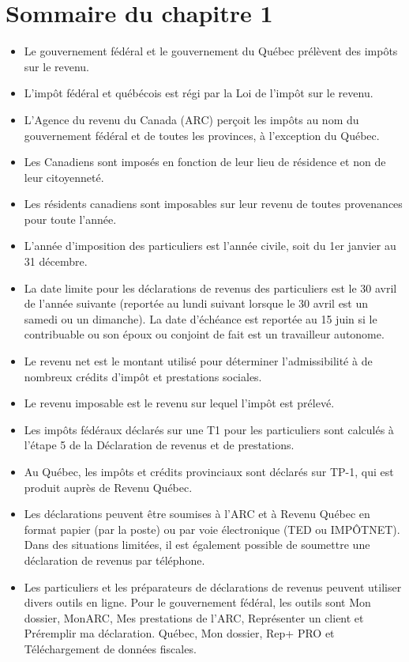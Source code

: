 \section{Sommaire du chapitre 1}
\begin{itemize}
	\item Le gouvernement fédéral et le gouvernement du Québec prélèvent des impôts sur le revenu.
	\item L'impôt fédéral et québécois est régi par la Loi de l'impôt sur le revenu.
	\item L'Agence du revenu du Canada (ARC) perçoit les impôts au nom du gouvernement fédéral et de toutes les provinces, à l'exception du Québec.
	\item Les Canadiens sont imposés en fonction de leur lieu de résidence et non de leur citoyenneté.
	\item Les résidents canadiens sont imposables sur leur revenu de toutes provenances pour toute l'année.
	\item L'année d'imposition des particuliers est l'année civile, soit du 1er janvier au 31 décembre.
	\item La date limite pour les déclarations de revenus des particuliers est le 30 avril de l'année suivante (reportée au lundi suivant lorsque le 30 avril est un samedi ou un dimanche). La date d'échéance est reportée au 15 juin si le contribuable ou son époux ou conjoint de fait est un travailleur autonome.
	\item Le revenu net est le montant utilisé pour déterminer l'admissibilité à de nombreux crédits d'impôt et prestations sociales.
	\item Le revenu imposable est le revenu sur lequel l'impôt est prélevé.
	\item Les impôts fédéraux déclarés sur une T1 pour les particuliers sont calculés à l'étape 5 de la Déclaration de revenus et de prestations.
	\item Au Québec, les impôts et crédits provinciaux sont déclarés sur TP-1, qui est produit auprès de Revenu Québec.
	\item Les déclarations peuvent être soumises à l'ARC et à Revenu Québec en format papier (par la poste) ou par voie électronique (TED ou IMPÔTNET). Dans des situations limitées, il est également possible de soumettre une déclaration de revenus par téléphone.
	\item Les particuliers et les préparateurs de déclarations de revenus peuvent utiliser divers outils en ligne. Pour le gouvernement fédéral, les outils sont Mon dossier, MonARC, Mes prestations de l'ARC, Représenter un client et Préremplir ma déclaration. Québec, Mon dossier, Rep+ PRO et Téléchargement de données fiscales.
\end{itemize}
